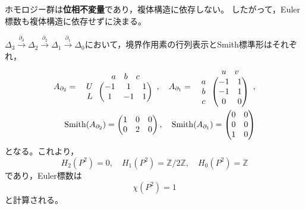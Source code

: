 \documentclass[uplatex]{jsarticle}
\begin{document}
 ホモロジー群は\textbf{位相不変量}であり，複体構造に依存しない。
したがって，Euler標数も複体構造に依存せずに決まる。

\begin{rei}[射影平面の例]
  $\Delta_{3} \xrightarrow{\partial_{3}} \Delta_{2} \xrightarrow{\partial_{2}} \Delta_{1} \xrightarrow{\partial_{1}} \Delta_{0}$において，境界作用素の行列表示とSmith標準形はそれぞれ，
  \begin{align}
    A_{\partial_{2}} = \begin{array}{c@{\,}c}
      & \begin{array}{ccc}
        a & b & c
      \end{array} \\
      \begin{array}{c}
        U \\ L
      \end{array} & 
      \begin{pmatrix}
        -1 & 1 & 1 \\
        1 & -1 & 1
      \end{pmatrix}  
    \end{array}
    , \quad 
    A_{\partial_{1}} = \begin{array}{c@{\,}c}
      & \begin{array}{cc}
        u & v
      \end{array} \\
      \begin{array}{c}
        a \\ b \\ c
      \end{array} &
      \begin{pmatrix}
      -1 & 1 \\
      -1 & 1 \\
      0 & 0
    \end{pmatrix}
  \end{array}, \\
  \mathrm{Smith}(A_{\partial_{2}}) = \begin{pmatrix}
    1 & 0 & 0 \\ 0 & 2 & 0
  \end{pmatrix}, \quad
  \mathrm{Smith}(A_{\partial_{1}}) = \begin{pmatrix}
    0 & 0 \\
    0 & 0 \\
    1 & 0
  \end{pmatrix}
  \end{align}
  となる。これより，
  \begin{equation}
    H_{2}(P^{2}) = 0, \quad H_{1}(P^{2}) = \mathbb{Z} / 2 \mathbb{Z}, \quad H_{0}(P^{2}) = \mathbb{Z}
  \end{equation}
  であり，Euler標数は
  \begin{equation}
    \chi (P^{2}) = 1
  \end{equation}
  と計算される。
\end{rei}
\end{document}
